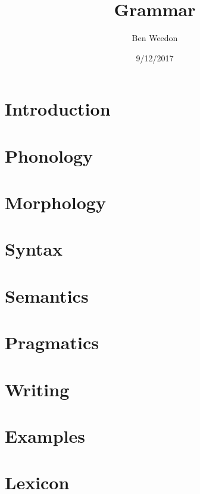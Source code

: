 \documentclass{article}
\title{\name{} Grammar}
\author{Ben Weedon}
\date{9/12/2017}
\begin{document}
    \maketitle

    \section{Introduction}
    
    \section{Phonology}
    
    \section{Morphology}
    
    \section{Syntax}
    
    \section{Semantics}
    
    \section{Pragmatics}
    
    \section{Writing}
    
    \section{Examples}
    
    \section{Lexicon}
    
\end{document}
